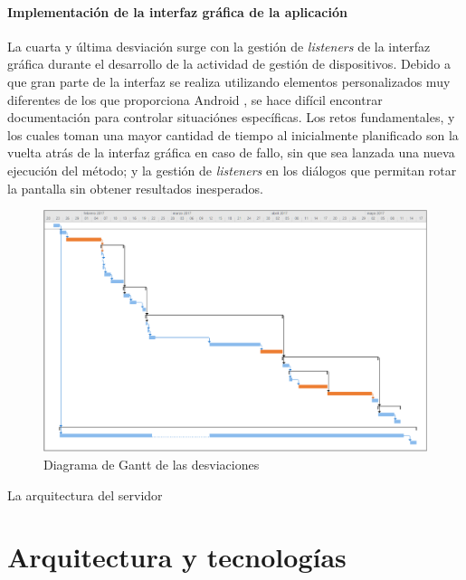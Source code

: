 \documentclass[12pt, twoside]{article}
\begin{document}
        \paragraph{ Implementación de la interfaz gráfica de la aplicación}
        La cuarta y última desviación surge con la gestión de \textit{listeners} de la interfaz gráfica durante el desarrollo de la actividad de gestión de dispositivos. Debido a que gran parte de la interfaz se realiza utilizando elementos personalizados muy diferentes de los que proporciona Android \cite{Color}, se hace difícil encontrar documentación para controlar situaciónes específicas. Los retos fundamentales, y los cuales toman una mayor cantidad de tiempo al inicialmente planificado son la vuelta atrás de la interfaz gráfica en caso de fallo, sin que sea lanzada una nueva ejecución del método; y la gestión de \textit{listeners} en los diálogos que permitan rotar la pantalla sin obtener resultados inesperados.
        
        \begin{figure}[h!]
            \centering
                \includegraphics[scale=0.7]{deviations_gantt.eps}
                \caption{Diagrama de Gantt de las desviaciones}
                \label{fig:deviations_gantt}
        \end{figure}

        La arquitectura del servidor 

\cleardoublepage \section{Arquitectura y tecnologías} \label{sec:arq}
\end{document}
